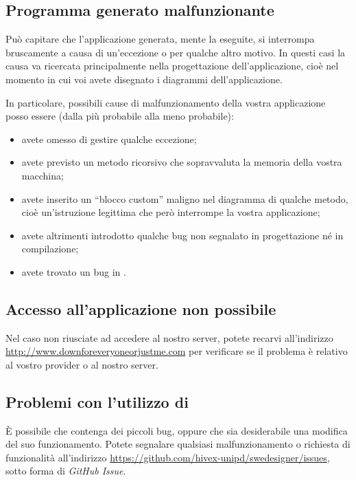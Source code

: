 \subsection{Programma generato malfunzionante} \label{sec:mal_gen}

Può capitare che l'applicazione generata, mente la eseguite, si interrompa bruscamente a causa di un'eccezione o per qualche altro motivo. In questi casi la causa va ricercata principalmente nella progettazione dell'applicazione, cioè nel momento in cui voi avete disegnato i diagrammi dell'applicazione.

In particolare, possibili cause di malfunzionamento della vostra applicazione posso essere (dalla più probabile alla meno probabile):
\begin{itemize}
	\item avete omesso di gestire qualche eccezione;
	\item avete previsto un metodo ricorsivo che sopravvaluta la memoria della vostra macchina;
	\item avete inserito un “blocco custom” maligno nel diagramma di qualche metodo, cioè un'istruzione legittima che però interrompe la vostra applicazione;
	\item avete altrimenti introdotto qualche bug non segnalato in progettazione né in compilazione;
	\item avete trovato un bug in \proj.
\end{itemize}



\subsection{Accesso all'applicazione non possibile}

Nel caso non riusciate ad accedere al nostro server, potete recarvi all'indirizzo \url{http://www.downforeveryoneorjustme.com} per verificare se il problema è relativo al vostro provider o al nostro server.



\subsection{Problemi con l'utilizzo di \proj}

È possibile che \proj{} contenga dei piccoli bug, oppure che sia desiderabile una modifica del suo funzionamento. Potete segnalare qualsiasi malfunzionamento o richiesta di funzionalità all'indirizzo \url{https://github.com/hivex-unipd/swedesigner/issues}, sotto forma di \emph{GitHub Issue}.





